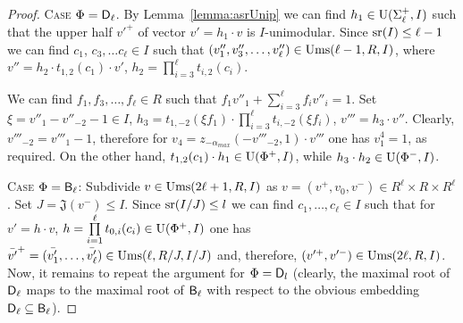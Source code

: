 \begin{proof}
\textsc{Case $\Phi=\mathsf{D}_\ell$.} 
By Lemma~\ref{lemma:asrUnip} we can find $h_1\in \operatorname{U}(\Sigma^+_\ell, I)$ such that the upper half $v'^+$ of vector $v'=h_1\cdot v$ is $I$-unimodular.
Since $\operatorname{sr}(I)\leq \ell-1$ we can find $c_1$, $c_3, \ldots c_\ell \in I$ such that $(v''_1, v''_3, \ldots, v''_\ell) \in \operatorname{Ums}(\ell-1, R, I)$, where
$v''=h_2 \cdot t_{1,2}(c_1) \cdot v'$, $h_2=\prod\limits_{i=3}^\ell t_{i,2}(c_i)$.

We can find $f_1, f_3,\ldots, f_\ell \in R$ such that $f_1v''_1+\sum\limits_{i=3}^\ell f_i v''_{i} = 1$.
Set $\xi = v''_1-v''_{-2}-1 \in I$, $h_3 = t_{1,-2}(\xi f_1) \cdot \prod\limits_{i=3}^\ell t_{i,-2}(\xi f_i)$, $v'''=h_3 \cdot v''$.
Clearly, $v'''_{-2}=v'''_1-1$, therefore for $v_4 = z_{-\alpha_{max}}(-v'''_{-2}, 1) \cdot v'''$ one has $v^4_1 = 1$, as required.
On the other hand, $t_{1,2}(c_1) \cdot h_1 \in \operatorname{U}(\Phi^+, I)$, while $ h_3 \cdot h_2 \in \operatorname{U}(\Phi^-, I)$.

\textsc{Case $\Phi=\mathsf{B}_\ell$:} Subdivide $v\in \operatorname{Ums}(2\ell+1, R, I)$ as $v=(v^+, v_0, v^-)\in R^\ell\times R\times R^\ell$.
Set $J = \mathfrak{J}(v^-) \leq I$.
Since $\operatorname{sr}(I/J)\leq l$ we can find $c_1,\dots,c_\ell\in I$ such that for $v' = h \cdot v$, $h = \prod\limits_{i=1}^\ell t_{0, i}(c_i) \in \operatorname{U}(\Phi^+, I)$
one has $\bar{v'}^+=(\bar{v'_1},\ldots, \bar{v'_\ell}) \in \operatorname{Ums}(\ell, R/J, I/J)$ and, therefore, $(v'^+, v'^-) \in \operatorname{Ums}(2\ell, R, I)$.
Now, it remains to repeat the argument for $\Phi=\mathsf{D}_l$ (clearly, the maximal root of $\mathsf{D}_\ell$ maps to the maximal root of $\mathsf{B}_\ell$ with respect to the obvious embedding $\mathsf{D}_\ell\subseteq\mathsf{B}_\ell$).





\end{proof}
